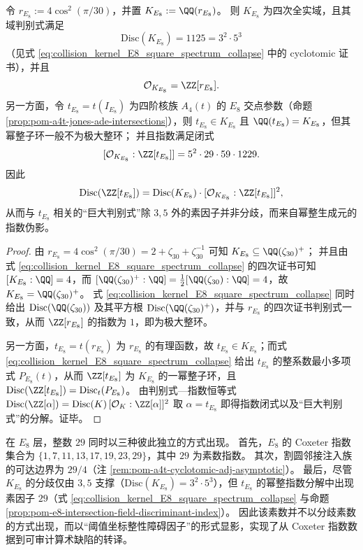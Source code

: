 \begin{proposition}\label{prop:pom-e8-intersection-field-discriminant-index}
令 \(r_{E_8}:=4\cos^2(\pi/30)\)，并置 \(K_{E_8}:=\QQ(r_{E_8})\)。
则 \(K_{E_8}\) 为四次全实域，且其域判别式满足
\[
\mathrm{Disc}(K_{E_8})=1125=3^2\cdot 5^3
\]
（见式 \eqref{eq:collision_kernel_E8_square_spectrum_collapse} 中的 cyclotomic 证书），并且
\[
\mathcal O_{K_{E_8}}=\ZZ[r_{E_8}].
\]
另一方面，令 \(t_{E_8}=t(I_{E_8})\) 为四阶核族 \(A_4(t)\) 的 \(E_8\) 交点参数（命题 \ref{prop:pom-a4t-jones-ade-intersections}），则 \(t_{E_8}\in K_{E_8}\) 且 \(\QQ(t_{E_8})=K_{E_8}\)，但其幂整子环一般不为极大整环；
并且指数满足闭式
\[
[\mathcal O_{K_{E_8}}:\ZZ[t_{E_8}]]=5^2\cdot 29\cdot 59\cdot 1229.
\]
因此
\[
\mathrm{Disc}(\ZZ[t_{E_8}])=\mathrm{Disc}(K_{E_8})\cdot[\mathcal O_{K_{E_8}}:\ZZ[t_{E_8}]]^{2},
\]
从而与 \(t_{E_8}\) 相关的“巨大判别式”除 \(3,5\) 外的素因子并非分歧，而来自幂整生成元的指数伪影。
\end{proposition}
\begin{proof}
由 \(r_{E_8}=4\cos^2(\pi/30)=2+\zeta_{30}+\zeta_{30}^{-1}\) 可知 \(K_{E_8}\subseteq \QQ(\zeta_{30})^+\)；
并且由式 \eqref{eq:collision_kernel_E8_square_spectrum_collapse} 的四次证书可知 \([K_{E_8}:\QQ]=4\)，而 \([\QQ(\zeta_{30})^+:\QQ]=\tfrac12[\QQ(\zeta_{30}):\QQ]=4\)，故 \(K_{E_8}=\QQ(\zeta_{30})^+\)。
式 \eqref{eq:collision_kernel_E8_square_spectrum_collapse} 同时给出 \(\mathrm{Disc}(\QQ(\zeta_{30}))\) 及其平方根 \(\mathrm{Disc}(\QQ(\zeta_{30})^+)\)，并与 \(r_{E_8}\) 的四次证书判别式一致，从而 \(\ZZ[r_{E_8}]\) 的指数为 \(1\)，即为极大整环。
\par
另一方面，\(t_{E_8}=t(r_{E_8})\) 为 \(r_{E_8}\) 的有理函数，故 \(t_{E_8}\in K_{E_8}\)；而式 \eqref{eq:collision_kernel_E8_square_spectrum_collapse} 给出 \(t_{E_8}\) 的整系数最小多项式 \(P_{E_8}(t)\)，从而 \(\ZZ[t_{E_8}]\) 为 \(K_{E_8}\) 的一幂整子环，且
\(\mathrm{Disc}(\ZZ[t_{E_8}])=\mathrm{Disc}_t(P_{E_8})\)。
由判别式—指数恒等式
\(
\mathrm{Disc}(\ZZ[\alpha])=\mathrm{Disc}(K)\,[\mathcal O_K:\ZZ[\alpha]]^2
\)
取 \(\alpha=t_{E_8}\) 即得指数闭式以及“巨大判别式”的分解。证毕。
\end{proof}

\begin{remark}\label{rem:pom-a4t-e8-29-triple-appearance}
在 \(E_8\) 层，整数 \(29\) 同时以三种彼此独立的方式出现。
首先，\(E_8\) 的 Coxeter 指数集合为 \(\{1,7,11,13,17,19,23,29\}\)，其中 \(29\) 为素数指数。
其次，割圆邻接注入族的可达边界为 \(29/4\)（注 \ref{rem:pom-a4t-cyclotomic-adj-asymptotic}）。
最后，尽管 \(K_{E_8}\) 的分歧仅由 \(3,5\) 支撑（\(\mathrm{Disc}(K_{E_8})=3^2\cdot 5^3\)），但 \(t_{E_8}\) 的幂整指数分解中出现素因子 \(29\)（式 \eqref{eq:collision_kernel_E8_square_spectrum_collapse} 与命题 \ref{prop:pom-e8-intersection-field-discriminant-index}）。
因此该素数并不以分歧素数的方式出现，而以“阈值坐标整性障碍因子”的形式显影，实现了从 Coxeter 指数数据到可审计算术缺陷的转译。
\end{remark}

